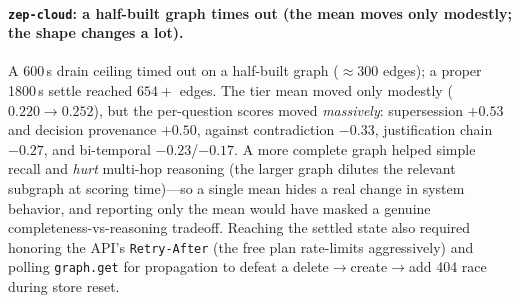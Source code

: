 \paragraph{\texttt{zep-cloud}: a half-built graph times out (the mean moves only
modestly; the shape changes a lot).}
A 600\,s drain ceiling timed out on a half-built graph ($\approx$300 edges); a
proper 1800\,s settle reached $654{+}$ edges. The tier mean moved only modestly
($0.220 \rightarrow 0.252$), but the per-question scores moved \emph{massively}:
supersession $+0.53$ and decision provenance $+0.50$, against contradiction
$-0.33$, justification chain $-0.27$, and bi-temporal $-0.23$/$-0.17$. A more
complete graph helped simple recall and \emph{hurt} multi-hop reasoning (the
larger graph dilutes the relevant subgraph at scoring time)---so a single mean
hides a real change in system behavior, and reporting only the mean would have
masked a genuine completeness-vs-reasoning tradeoff. Reaching the settled state
also required honoring the API's \texttt{Retry-After} (the free plan rate-limits
aggressively) and polling \texttt{graph.get} for propagation to defeat a
delete$\rightarrow$create$\rightarrow$add 404 race during store reset.
